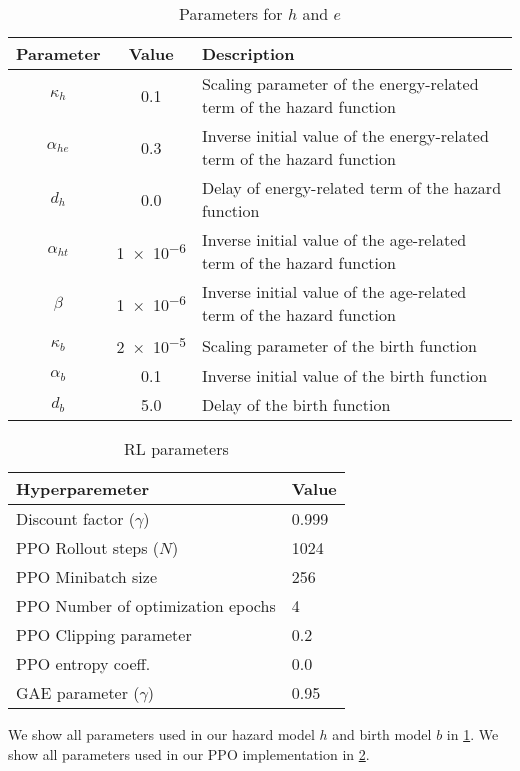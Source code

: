 \begin{table}[t]
  \centering
  \caption{Parameters for $h$ and $e$}\label{tab:bd-param}
  \begin{tabular}{ccl}
  \toprule
    Parameter & Value & Description \\
    \midrule
    $\kappa_{h}$ & 0.1 & Scaling parameter of the energy-related term of the hazard function \\
    $\alpha_{he}$ & 0.3 & Inverse initial value of the energy-related term of the hazard function \\
    $d_{h}$ & 0.0 & Delay of energy-related term of the hazard function \\
    $\alpha_{ht}$ & \num{1e-6} & Inverse initial value of the age-related term of the hazard function \\
    $\beta$ & \num{1e-6} & Inverse initial value of the age-related term of the hazard function \\
    $\kappa_{b}$ & \num{2e-5} & Scaling parameter of the birth function\\
    $\alpha_{b}$ & 0.1 & Inverse initial value of the birth function \\
    $d_{b}$ & 5.0 & Delay of the birth function \\
    \bottomrule
  \end{tabular}
\end{table}

\begin{table}[t]
  \centering
  \caption{RL parameters}\label{tab:rl-param}
  \begin{tabular}{ll}
  \toprule
    Hyperparemeter & Value \\
    \midrule
    Discount factor ($\gamma$) & 0.999 \\
    PPO Rollout steps ($N$) & 1024 \\
    PPO Minibatch size & 256 \\
    PPO Number of optimization epochs & 4 \\
    PPO Clipping parameter & 0.2 \\
    PPO entropy coeff. & 0.0 \\
    GAE parameter ($\gamma$) & 0.95 \\
  \end{tabular}
\end{table}

We show all parameters used in our hazard model $h$ and birth model $b$ in \cref{tab:bd-param}.
We show all parameters used in our PPO implementation in \cref{tab:rl-param}.